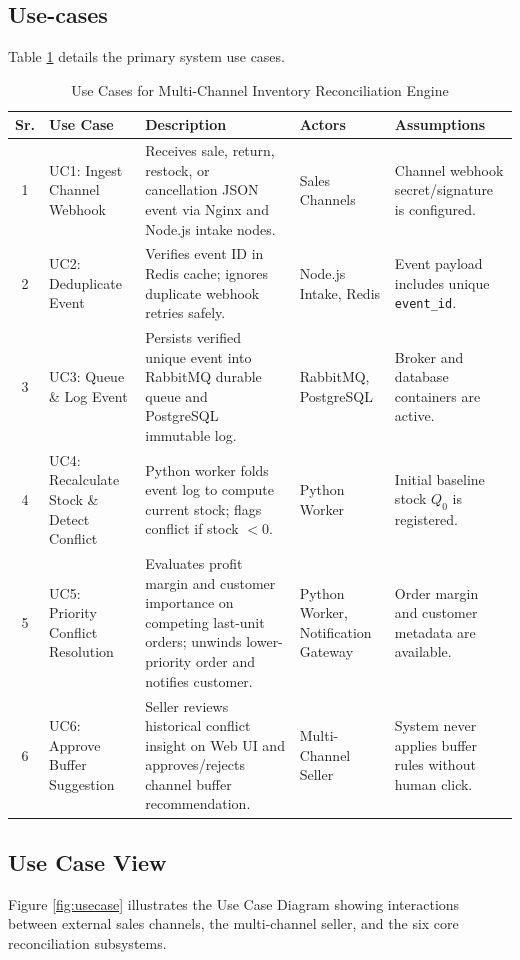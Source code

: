 \documentclass[oneside,a4paper,12pt]{report}
\begin{document}
\subsection{Use-cases}
Table \ref{tab:usecase} details the primary system use cases.

\begin{table}[!htbp]
\begin{center}
\footnotesize
\renewcommand{\arraystretch}{1.35}
\begin{tabularx}{\textwidth}{|c|p{2.8cm}|X|p{2.4cm}|p{2.8cm}|}
\hline
\textbf{Sr.} & \textbf{Use Case} & \textbf{Description} & \textbf{Actors} & \textbf{Assumptions} \\ \hline
1 & UC1: Ingest Channel Webhook & Receives sale, return, restock, or cancellation JSON event via Nginx and Node.js intake nodes. & Sales Channels & Channel webhook secret/signature is configured. \\ \hline
2 & UC2: Deduplicate Event & Verifies event ID in Redis cache; ignores duplicate webhook retries safely. & Node.js Intake, Redis & Event payload includes unique \texttt{event\_id}. \\ \hline
3 & UC3: Queue \& Log Event & Persists verified unique event into RabbitMQ durable queue and PostgreSQL immutable log. & RabbitMQ, PostgreSQL & Broker and database containers are active. \\ \hline
4 & UC4: Recalculate Stock \& Detect Conflict & Python worker folds event log to compute current stock; flags conflict if stock $< 0$. & Python Worker & Initial baseline stock $Q_0$ is registered. \\ \hline
5 & UC5: Priority Conflict Resolution & Evaluates profit margin and customer importance on competing last-unit orders; unwinds lower-priority order and notifies customer. & Python Worker, Notification Gateway & Order margin and customer metadata are available. \\ \hline
6 & UC6: Approve Buffer Suggestion & Seller reviews historical conflict insight on Web UI and approves/rejects channel buffer recommendation. & Multi-Channel Seller & System never applies buffer rules without human click. \\ \hline
\end{tabularx}
\end{center}
\caption{Use Cases for Multi-Channel Inventory Reconciliation Engine}
\label{tab:usecase}
\end{table}

\subsection{Use Case View}
Figure \ref{fig:usecase} illustrates the Use Case Diagram showing interactions between external sales channels, the multi-channel seller, and the six core reconciliation subsystems.
\end{document}
